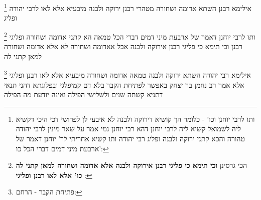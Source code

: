 \documentclass[12pt, openany]{book}
\newcommand{\footnotecomment}[1]{
	\renewcommand\thefootnote{}
	\footnote{#1}}
\newcommand{\commenta}[1]{\footnotecomment{#1}}
\begin{document}
{\commenta{ותו לרבי יוחנן וכו' - כלומר הך קושיא דירוקה ולבנה לא איבעי לן לפרושי דכי היכי דקשיא ליה לשמואל קשיא ליה לרבי יוחנן דהא רבי יוחנן נמי אמר על שאר מינין לרבי יהודה טהורה והכא קתני ירוקה ולבנה ופליג רבי יהודה ותו קשיא אחריתי לר' יוחנן דאמר של ארבעת מיני דמים דברי הכל כו':}
אילימא רבנן השתא אדומה ושחורה מטהרי רבנן ירוקה ולבנה מיבעיא אלא לאו לרבי יהודה ופליג 
\commenta{הכי גרסינן \textbf{וכי תימא כי פליגי רבנן אירוקה ולבנה אלא אדומה ושחורה למאן קתני לה כו' אלא לאו רבנן ופליגי} :}
ותו לרבי יוחנן דאמר של ארבעת מיני דמים דברי הכל טמאה הא קתני אדומה ושחורה ופליגי רבנן 
וכי תימא כי פליגי רבנן אירוקה ולבנה אבל אאדומה ושחורה לא אלא אדומה ושחורה למאן קתני לה 
\commenta{פתיחת הקבר - הרחם:}
אילימא רבי יהודה השתא ירוקה ולבנה טמאה אדומה ושחורה מיבעיא אלא לאו רבנן ופליגי 
אלא אמר רב נחמן בר יצחק באפשר לפתיחת הקבר בלא דם קמיפלגי ובפלוגתא דהני תנאי דתניא קשתה שנים ולשלישי הפילה ואינה יודעת מה הפילה}
\end{document}
